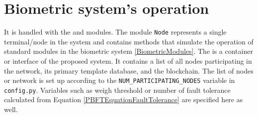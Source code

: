 \section{Biometric system's operation}
It is handled with the  and  modules. The module \texttt{Node} represents a single terminal/node in the system and contains methods that simulate the operation of standard modules in the biometric system \ref{BiometricModules}. 
The  is a container or interface of the proposed system. It contains a list of all nodes participating in the network, its primary template database, and the blockchain. The list of nodes or network is set up according to the \texttt{NUM\_PARTICIPATING\_NODES} variable in \texttt{config.py}. Variables such as weigh threshold or number of fault tolerance calculated from Equation \ref{PBFTEquationFaultTolerance} are specified here as well. 

